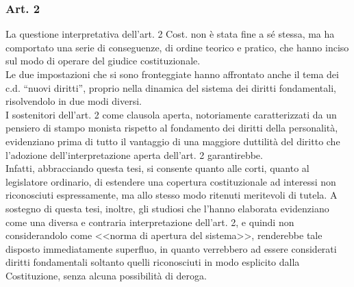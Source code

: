 \subsubsection{Art. 2}
La questione interpretativa dell’art. 2 Cost. non è stata fine a sé stessa, ma ha comportato una serie di conseguenze, di ordine teorico e pratico, che hanno inciso sul modo di operare del giudice costituzionale.  
\\Le due impostazioni che si sono fronteggiate hanno affrontato anche il tema dei c.d. “nuovi diritti”, proprio nella dinamica del sistema dei diritti fondamentali, risolvendolo in due modi diversi.
\\I sostenitori dell'art. 2 come clausola aperta, notoriamente caratterizzati da un pensiero di stampo monista rispetto al fondamento dei diritti della personalità, evidenziano prima di tutto il vantaggio di una maggiore duttilità del diritto che l'adozione dell'interpretazione aperta dell'art. 2 garantirebbe.
\\Infatti, abbracciando questa tesi, si consente quanto alle corti, quanto al legislatore ordinario, di estendere una copertura costituzionale ad interessi non riconosciuti espressamente, ma allo stesso modo ritenuti meritevoli di tutela. A sostegno di questa tesi, inoltre, gli studiosi che l'hanno elaborata evidenziano come una diversa e contraria interpretazione dell'art. 2, e quindi non considerandolo come <<norma di apertura del sistema>>, renderebbe tale disposto immediatamente superfluo, in quanto verrebbero ad essere considerati diritti fondamentali soltanto quelli riconosciuti in modo esplicito dalla Costituzione, senza alcuna possibilità di deroga.
